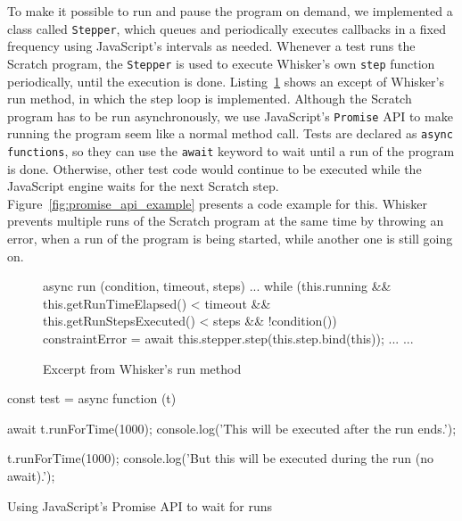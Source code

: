 To make it possible to run and pause the program on demand, we implemented a class called \texttt{Stepper},
which queues and periodically executes callbacks in a fixed frequency using JavaScript's intervals as needed.
Whenever a test runs the Scratch program,
the \texttt{Stepper} is used to execute Whisker's own \texttt{step} function periodically,
until the execution is done.
Listing~\ref{fig:run_method_excerpt} shows an except of Whisker's run method,
in which the step loop is implemented.
Although the Scratch program has to be run asynchronously, we use JavaScript's \texttt{Promise} API to make running the program seem like a normal method call.
Tests are declared as \texttt{async functions}, so they can use the \texttt{await} keyword to wait until a run of the program is done.
Otherwise, other test code would continue to be executed while the JavaScript engine waits for the next Scratch step.
Figure~\ref{fig:promise_api_example} presents a code example for this.
Whisker prevents multiple runs of the Scratch program at the same time by throwing an error,
when a run of the program is being started, while another one is still going on.
\parspace

\begin{figure}[htpb]
    \centering

    \begin{minipage}{.9\textwidth}
        \begin{javascriptcode}
            async run (condition, timeout, steps) {
                ...
                while (this.running &&
                       this.getRunTimeElapsed() < timeout &&
                       this.getRunStepsExecuted() < steps &&
                       !condition()) {
                    constraintError = await this.stepper.step(this.step.bind(this));
                    ...
                }
                ...
            }
        \end{javascriptcode}
    \end{minipage}

    \caption{Excerpt from Whisker's run method}
    \label{fig:run_method_excerpt}
\end{figure}

\begin{listing}
    \centering

    \begin{minipage}{.9\textwidth}
        \begin{javascriptcode}
            const test = async function (t) {
                await t.runForTime(1000);
                console.log('This will be executed after the run ends.');

                t.runForTime(1000);
                console.log('But this will be executed during the run (no await).');
            }
        \end{javascriptcode}
    \end{minipage}

    \caption{Using JavaScript's Promise API to wait for runs}
    \label{fig:promise_api_example}
\end{listing}

